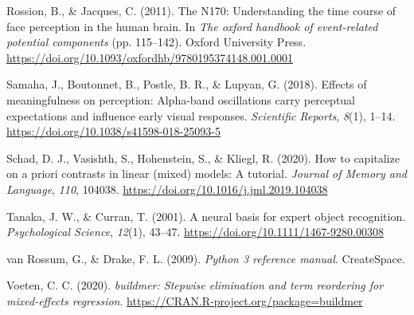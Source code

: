 \documentclass[
  english,
  man,11pt,floatsintext]{apa7}
\newlength{\cslhangindent}
\newenvironment{cslreferences}%
  {\setlength{\parindent}{0pt}%
  \everypar{\setlength{\hangindent}{\cslhangindent}}\ignorespaces}%
  {\par}
\begin{document}
\begin{cslreferences}
\leavevmode\hypertarget{ref-rossion2011}{}%
Rossion, B., \& Jacques, C. (2011). The N170: Understanding the time course of face perception in the human brain. In \emph{The oxford handbook of event-related potential components} (pp. 115--142). Oxford University Press. \url{https://doi.org/10.1093/oxfordhb/9780195374148.001.0001}

\leavevmode\hypertarget{ref-samaha2018}{}%
Samaha, J., Boutonnet, B., Postle, B. R., \& Lupyan, G. (2018). Effects of meaningfulness on perception: Alpha-band oscillations carry perceptual expectations and influence early visual responses. \emph{Scientific Reports}, \emph{8}(1), 1--14. \url{https://doi.org/10.1038/s41598-018-25093-5}

\leavevmode\hypertarget{ref-schad2020}{}%
Schad, D. J., Vasishth, S., Hohenstein, S., \& Kliegl, R. (2020). How to capitalize on a priori contrasts in linear (mixed) models: A tutorial. \emph{Journal of Memory and Language}, \emph{110}, 104038. \url{https://doi.org/10.1016/j.jml.2019.104038}

\leavevmode\hypertarget{ref-tanaka2001}{}%
Tanaka, J. W., \& Curran, T. (2001). A neural basis for expert object recognition. \emph{Psychological Science}, \emph{12}(1), 43--47. \url{https://doi.org/10.1111/1467-9280.00308}

\leavevmode\hypertarget{ref-vanrossum2009}{}%
van Rossum, G., \& Drake, F. L. (2009). \emph{Python 3 reference manual}. CreateSpace.

\leavevmode\hypertarget{ref-R-buildmer}{}%
Voeten, C. C. (2020). \emph{buildmer: Stepwise elimination and term reordering for mixed-effects regression}. \url{https://CRAN.R-project.org/package=buildmer}
\end{cslreferences}
\end{document}
